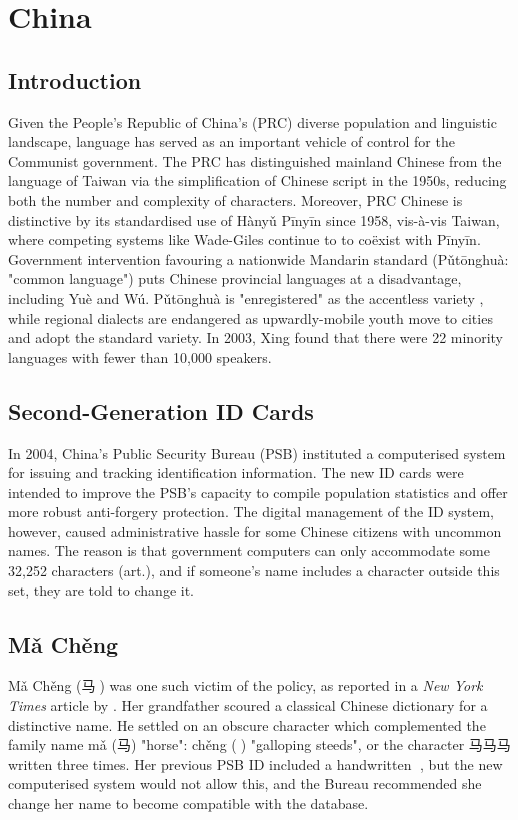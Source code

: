 \section{China}

\subsection{Introduction}

Given the People's Republic of China's (PRC) diverse population and linguistic
landscape, language has served as an important vehicle of control for the
Communist government. The PRC has distinguished mainland Chinese from the
language of Taiwan via the simplification of Chinese script in the 1950s,
reducing both the number and complexity of characters. Moreover, PRC Chinese is
distinctive by its standardised use of Hànyǔ Pīnyīn since 1958, vis-à-vis
Taiwan, where competing systems like Wade-Giles continue to to coëxist with
Pīnyīn. Government intervention favouring a nationwide Mandarin standard
(Pǔtōnghuà: "common language") puts Chinese provincial languages at a
disadvantage, including Yuè and Wú. Pǔtōnghuà is "enregistered" as the
accentless variety \parencite{dong10}, while regional dialects are endangered as
upwardly-mobile youth move to cities and adopt the standard variety. In 2003,
Xing found that there were 22 minority languages with fewer than 10,000
speakers.

\subsection{Second-Generation ID Cards}

In 2004, China's Public Security Bureau (PSB) instituted a computerised system for
issuing and tracking identification information. The new ID cards were intended
to improve the PSB's capacity to compile population statistics and offer more
robust anti-forgery protection. The digital management of the ID system,
however, caused administrative hassle for some Chinese citizens with uncommon
names. The reason is that government computers can only accommodate some 32,252
characters (art.), and if someone's name includes a character outside this set,
they are told to change it.

\subsection{Mǎ Chěng}

Mǎ Chěng ({\zafont 马}{\zbfont 𩧢}) was one such victim of the policy, as reported
in a \textit{New York Times} article by \textcite{lafraniere09}. Her grandfather
scoured a classical Chinese dictionary for a distinctive name. He settled on an
obscure character which complemented the family name mǎ ({\zafont 马}) "horse":
chěng ({\zbfont 𩧢}) "galloping steeds", or the character {\zafont 马马马} written
three times. Her previous PSB ID included a handwritten {\zbfont 𩧢}, but the new
computerised system would not allow this, and the Bureau recommended she change
her name to become compatible with the database.

